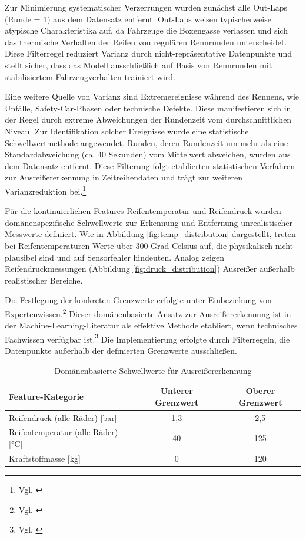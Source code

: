 Zur Minimierung systematischer Verzerrungen wurden zunächst alle Out-Laps (Runde = 1) aus dem Datensatz entfernt. Out-Laps weisen typischerweise atypische Charakteristika auf, da Fahrzeuge die Boxengasse verlassen und sich das thermische Verhalten der Reifen von regulären Rennrunden unterscheidet. Diese Filterregel reduziert Varianz durch nicht-repräsentative Datenpunkte und stellt sicher, dass das Modell ausschließlich auf Basis von Rennrunden mit stabilisiertem Fahrzeugverhalten trainiert wird.

Eine weitere Quelle von Varianz sind Extremereignisse während des Rennens, wie Unfälle, Safety-Car-Phasen oder technische Defekte. Diese manifestieren sich in der Regel durch extreme Abweichungen der Rundenzeit vom durchschnittlichen Niveau. Zur Identifikation solcher Ereignisse wurde eine statistische Schwellwertmethode angewendet. Runden, deren Rundenzeit um mehr als eine Standardabweichung (ca. 40 Sekunden) vom Mittelwert abweichen, wurden aus dem Datensatz entfernt. Diese Filterung folgt etablierten statistischen Verfahren zur Ausreißererkennung in Zeitreihendaten und trägt zur weiteren Varianzreduktion bei.\footnote{Vgl. \cite{Dash2023}}

Für die kontinuierlichen Features Reifentemperatur und Reifendruck wurden domänenspezifische Schwellwerte zur Erkennung und Entfernung unrealistischer Messwerte definiert. Wie in Abbildung \ref{fig:temp_distribution} dargestellt, treten bei Reifentemperaturen Werte über 300 Grad Celsius auf, die physikalisch nicht plausibel sind und auf Sensorfehler hindeuten. Analog zeigen Reifendruckmessungen (Abbildung \ref{fig:druck_distribution}) Ausreißer außerhalb realistischer Bereiche.

Die Festlegung der konkreten Grenzwerte erfolgte unter Einbeziehung von Expertenwissen.\footnote{Vgl. \cite{Experteninterview1}} Dieser domänenbasierte Ansatz zur Ausreißererkennung ist in der Machine-Learning-Literatur als effektive Methode etabliert, wenn technisches Fachwissen verfügbar ist.\footnote{Vgl. \cite{Alan2011}} Die Implementierung erfolgte durch Filterregeln, die Datenpunkte außerhalb der definierten Grenzwerte ausschließen.

\begin{table}[H]
  \centering
  \begin{tabular}{lcc}
    \toprule
    \textbf{Feature-Kategorie} & \textbf{Unterer Grenzwert} & \textbf{Oberer Grenzwert} \\
    \midrule
    Reifendruck (alle Räder) [bar] & 1,3 & 2,5 \\
    Reifentemperatur (alle Räder) [°C] & 40 & 125 \\
    Kraftstoffmasse [kg] & 0 & 120 \\
    \bottomrule
  \end{tabular}
  \caption{Domänenbasierte Schwellwerte für Ausreißererkennung}
  \label{tab:threshold_values}
\end{table}


